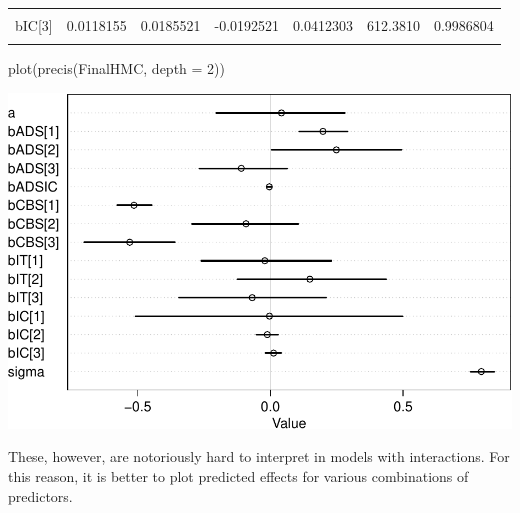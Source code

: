 \documentclass[
  10pt,
  dvipsnames,enabledeprecatedfontcommands]{scrartcl}
\newenvironment{Shaded}{\begin{snugshade}}{\end{snugshade}}
\newcommand{\AttributeTok}[1]{\textcolor[rgb]{0.77,0.63,0.00}{#1}}
\newcommand{\DecValTok}[1]{\textcolor[rgb]{0.00,0.00,0.81}{#1}}
\newcommand{\FunctionTok}[1]{\textcolor[rgb]{0.00,0.00,0.00}{#1}}
\newcommand{\NormalTok}[1]{#1}
\begin{document}
\begin{table}
\begin{tabular}{lrrrrrr}
\cellcolor{gray!6}{bIC[2]} & \cellcolor{gray!6}{-0.0117801} & \cellcolor{gray!6}{0.0256771} & \cellcolor{gray!6}{-0.0529960} & \cellcolor{gray!6}{0.0290304} & \cellcolor{gray!6}{488.1809} & \cellcolor{gray!6}{0.9994090}\\
bIC[3] & 0.0118155 & 0.0185521 & -0.0192521 & 0.0412303 & 612.3810 & 0.9986804\\
\cellcolor{gray!6}{sigma} & \cellcolor{gray!6}{0.7945882} & \cellcolor{gray!6}{0.0277774} & \cellcolor{gray!6}{0.7535960} & \cellcolor{gray!6}{0.8434971} & \cellcolor{gray!6}{693.5845} & \cellcolor{gray!6}{0.9982674}\\
\bottomrule
\end{tabular}
\endgroup{}
\end{table}

\begin{Shaded}
\begin{Highlighting}[]
\FunctionTok{plot}\NormalTok{(}\FunctionTok{precis}\NormalTok{(FinalHMC, }\AttributeTok{depth =} \DecValTok{2}\NormalTok{))}
\end{Highlighting}
\end{Shaded}

\begin{center}\includegraphics[width=1\linewidth]{bayesianReport3_files/figure-latex/unnamed-chunk-11-1} \end{center}
\normalsize

These, however, are notoriously hard to interpret in models with
interactions. For this reason, it is better to plot predicted effects
for various combinations of predictors.

\vspace{1mm}
\footnotesize
\end{document}
